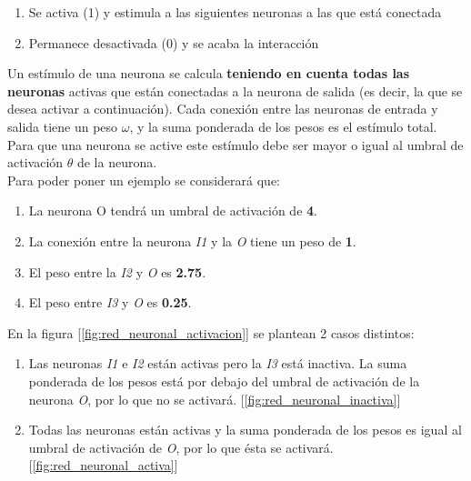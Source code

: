 \begin{enumerate}
    \item Se activa (1) y estimula a las siguientes neuronas a las que está conectada
    \item Permanece desactivada (0) y se acaba la interacción 
\end{enumerate}

Un estímulo de una neurona se calcula \textbf{teniendo en cuenta todas las neuronas} activas que están conectadas a la neurona de salida (es decir, la que se desea activar a continuación). Cada conexión entre las neuronas de entrada y salida tiene un peso $\omega$, y la suma ponderada de los pesos es el estímulo total. Para que una neurona se active este estímulo debe ser mayor o igual al umbral de activación $\theta$ de la neurona. \\

Para poder poner un ejemplo se considerará que:

\begin{enumerate}
    \item La neurona O tendrá un umbral de activación de \textbf{4}.
    \item La conexión entre la neurona \textit{I1} y la \textit{O} tiene un peso de \textbf{1}.
    \item El peso entre la \textit{I2} y \textit{O} es \textbf{2.75}.
    \item El peso entre \textit{I3} y \textit{O} es \textbf{0.25}.
\end{enumerate} 

En la figura [\ref{fig:red_neuronal_activacion}] se plantean 2 casos distintos: 

\begin{enumerate}
    \item Las neuronas \textit{I1} e \textit{I2} están activas pero la \textit{I3} está inactiva. La suma ponderada de los pesos está por debajo del umbral de activación de la neurona \textit{O}, por lo que no se activará. [\ref{fig:red_neuronal_inactiva}]
    \item Todas las neuronas están activas y la suma ponderada de los pesos es igual al umbral de activación de \textit{O}, por lo que ésta se activará. [\ref{fig:red_neuronal_activa}]
\end{enumerate}

